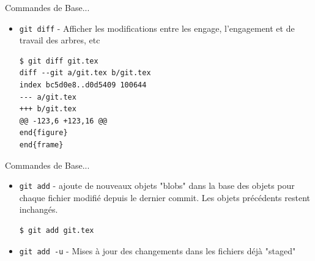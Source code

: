 \documentclass{beamer}
\begin{document}
\begin{frame}[containsverbatim]{Commandes de Base...}
  \begin{itemize}
\item \lstinline|git diff| - Afficher les modifications entre les engage, l'engagement et de travail des arbres, etc
\begin{lstlisting}
$ git diff git.tex
diff --git a/git.tex b/git.tex
index bc5d0e8..d0d5409 100644
--- a/git.tex
+++ b/git.tex
@@ -123,6 +123,16 @@
end{figure}
end{frame}
\end{lstlisting}

\end{itemize}
\end{frame}
\begin{frame}[containsverbatim]{Commandes de Base...}
  \begin{itemize}
\item \lstinline|git add| - ajoute de nouveaux objets "blobs" dans la base des objets pour chaque fichier modifié depuis le dernier commit.
Les objets précédents restent inchangés.
\begin{lstlisting}
$ git add git.tex
\end{lstlisting}

\item \lstinline|git add -u| - Mises à jour des changements dans les fichiers déjà "staged"

  \end{itemize}
\end{frame}
\end{document}
